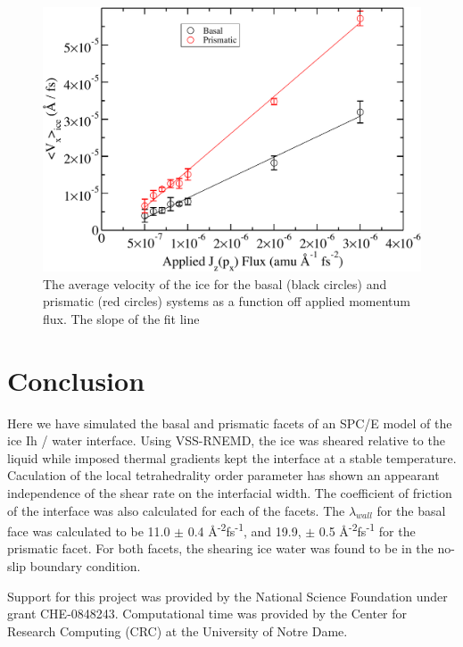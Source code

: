 \documentclass[journal = jpccck, manuscript = article]{achemso}
\begin{document}
\begin{figure}
\includegraphics[width=\linewidth]{CoeffFric}
\caption{\label{fig:CoeffFric} The average velocity of the ice for the basal (black circles) and prismatic (red circles) systems as a function off applied momentum flux. The slope of the fit line   }
\end{figure}

\section{Conclusion}
Here we have simulated the basal and prismatic facets of an SPC/E model of the ice Ih / water interface. Using VSS-RNEMD, the ice was sheared relative to the liquid while imposed thermal gradients kept the interface at a stable temperature. Caculation of the local tetrahedrality order parameter has shown an appearant independence of the shear rate on the interfacial width. The coefficient of friction of the interface was also calculated for each of the facets. The $\lambda_{wall}$ for the basal face was calculated to be 11.0 $\pm$ 0.4 \AA\textsuperscript{-2}fs\textsuperscript{-1}, and 19.9, $\pm$ 0.5 \AA\textsuperscript{-2}fs\textsuperscript{-1} for the prismatic facet. For both facets, the shearing ice water was found to be in the no-slip boundary condition.  


\begin{acknowledgement}
  Support for this project was provided by the National Science
  Foundation under grant CHE-0848243. Computational time was provided
  by the Center for Research Computing (CRC) at the University of
  Notre Dame.
\end{acknowledgement}
\end{document}
